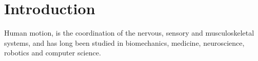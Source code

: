 \documentclass[12pt]{report}
\begin{document}







\chapter{Introduction}

Human motion, is the coordination of the nervous, sensory and musculoskeletal systems, and has long been studied in biomechanics, medicine, neuroscience, robotics and computer science.
\end{document}
